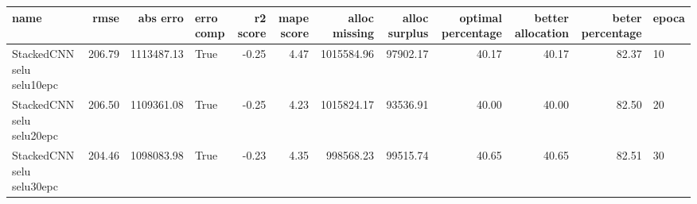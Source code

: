 \begin{tabular}{lrrlrrrrrrrl}
\toprule
name & rmse & abs erro & erro comp & r2 score & mape score & alloc missing & alloc surplus & optimal percentage & better allocation & beter percentage & epoca \\
\midrule
StackedCNN selu selu10epc & 206.79 & 1113487.13 & True & -0.25 & 4.47 & 1015584.96 & 97902.17 & 40.17 & 40.17 & 82.37 & 10 \\
StackedCNN selu selu20epc & 206.50 & 1109361.08 & True & -0.25 & 4.23 & 1015824.17 & 93536.91 & 40.00 & 40.00 & 82.50 & 20 \\
StackedCNN selu selu30epc & 204.46 & 1098083.98 & True & -0.23 & 4.35 & 998568.23 & 99515.74 & 40.65 & 40.65 & 82.51 & 30 \\
\bottomrule
\end{tabular}
